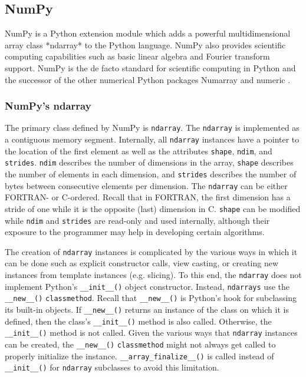 \documentclass[preprint]{sigplanconf}
\begin{document}
\subsection{NumPy}

NumPy \cite{Oli06} is a Python extension module which adds a powerful
multidimensional array class *ndarray* to the Python language. NumPy also
provides scientific computing capabilities such as basic linear algebra and
Fourier transform support. NumPy is the de facto standard for scientific
computing in Python and the successor of the other numerical Python packages
Numarray \cite{Dub96} and numeric \cite{Asc99}.

\subsubsection{NumPy's ndarray}

The primary class defined by NumPy is \verb=ndarray=. The \verb=ndarray= is
implemented as a contiguous memory segment. Internally, all \verb=ndarray=
instances have a pointer to the location of the first element as well as the
attributes \verb=shape=, \verb=ndim=, and \verb=strides=. \verb=ndim=
describes the number of dimensions in the array, \verb=shape= describes the
number of elements in each dimension, and \verb=strides= describes the number
of bytes between consecutive elements per dimension. The \verb=ndarray= can be
either FORTRAN- or C-ordered.  Recall that in FORTRAN, the first dimension has
a stride of one while it is the opposite (last) dimension in C. \verb=shape=
can be modified while \verb=ndim= and \verb=strides= are read-only and used
internally, although their exposure to the programmer may help in developing
certain algorithms.

The creation of \verb=ndarray= instances is complicated by the various ways in
which it can be done such as explicit constructor calls, view casting, or
creating new instances from template instances (e.g. slicing). To this end,
the \verb=ndarray= does not implement Python’s \verb=__init__()= object
constructor.  Instead, \verb=ndarrays= use the \verb=__new__()=
\verb=classmethod=. Recall that \verb=__new__()= is Python’s hook for
subclassing its built-in objects. If \verb=__new__()= returns an instance of
the class on which it is defined, then the class's \verb=__init__()= method is
also called. Otherwise, the \verb=__init__()= method is not called. Given the
various ways that \verb=ndarray= instances can be created, the
\verb=__new__()= \verb=classmethod= might not always get called to properly
initialize the instance.  \verb=__array_finalize__()= is called instead of
\verb=__init__()= for \verb=ndarray= subclasses to avoid this limitation.
\end{document}
